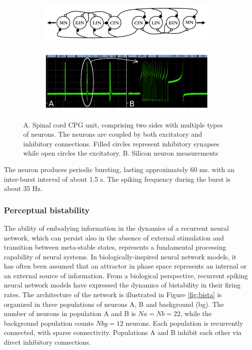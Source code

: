 \documentclass[main]{subfiles}
\begin{document}
%
\begin{figure}
     \centering
     \begin{subfigure}[b]{0.47\textwidth}
        \centering
        \includegraphics[width=\textwidth]{12_NeuromorphicSystems2/figures/cpg0.PNG}
        \caption{}
        \label{fig:cpg0}
     \end{subfigure}
     \hfill
     \begin{subfigure}[b]{0.47\textwidth}
         \centering
        \includegraphics[width=\textwidth]{12_NeuromorphicSystems2/figures/cpg.PNG}
        \caption{}
        \label{fig:cpg1}
     \end{subfigure}
        \caption{A. Spinal cord  CPG unit, comprising two sides with multiple types of neurons. The neurons are coupled by both excitatory and inhibitory connections. Filled circles represent inhibitory synapses while open circles the excitatory. B. Silicon neuron measurements}
        \label{fig:cpg}
\end{figure}
%

The neuron produces periodic bursting, lasting approximately 60 ms. with an inter-burst interval of about 1.5 s. The spiking frequency during the burst is about 35 Hz.

\subsubsection{Perceptual bistability}
The ability of embodying information in the dynamics of a recurrent neural network, which can persist also in the absence of external stimulation and transition between meta-stable states, represents a fundamental processing capability of neural systems. In biologically-inspired neural network models, it has often been assumed that an attractor in phase space represents an internal or an external source of information. From a biological perspective, recurrent spiking neural network models have expressed the dynamics of bistability in their firing rates. The architecture of the network is illustrated in Figure \ref{fig:bista} is organized in three populations of neurons A, B and background (bg). The number of neurons in population A and B is $Na=Nb=22$, while the background population counts $Nbg=12$ neurons. Each population is recurrently connected, with sparse connectivity. Populations A and B inhibit each other via direct inhibitory connections. 
\end{document}
